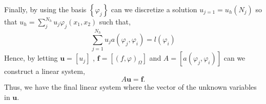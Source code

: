 Finally, by using the basis $\left\{ \varphi _{j} \right\} $ can we discretize a solution $u_{j=1} = u_{h}\left( N_{j} \right) $ so that $u_{h} = \sum_{j}^{N_{h}} u_{j} \varphi _{j}\left( x_{1},x_{2} \right)  $ such that, \[
\sum_{j = 1}^{N_{h}} u_{j} a\left( \varphi _{j}, \varphi _{i} \right)  = l\left( \varphi _{i} \right)
\]
Hence, by letting $\mathbf{u} = \left[ u_{j} \right] $ , $\mathbf{f} = \left[ \left( f, \varphi  \right) _{\Omega } \right] $  and $A = \left[ a\left( \varphi _{j}, \varphi _{i} \right)  \right] $ can we construct a linear system, \[
A \mathbf{u} =\mathbf{f}.
\]
Thus, we have the final linear system where the vector of the unknown variables in $\mathbf{u}$.
















